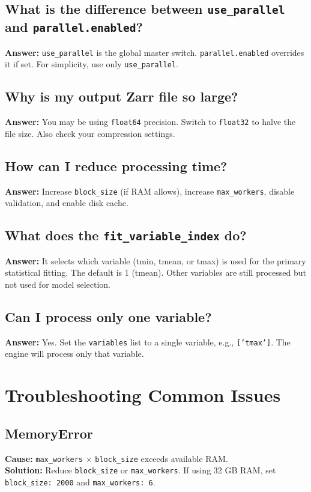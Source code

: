\documentclass[12pt,a4paper]{article}
\begin{document}
\subsection{What is the difference between \texttt{use\_parallel} and \texttt{parallel.enabled}?}
\textbf{Answer:} \texttt{use\_parallel} is the global master switch. \texttt{parallel.enabled} overrides it if set. For simplicity, use only \texttt{use\_parallel}.

\subsection{Why is my output Zarr file so large?}
\textbf{Answer:} You may be using \texttt{float64} precision. Switch to \texttt{float32} to halve the file size. Also check your compression settings.

\subsection{How can I reduce processing time?}
\textbf{Answer:} Increase \texttt{block\_size} (if RAM allows), increase \texttt{max\_workers}, disable validation, and enable disk cache.

\subsection{What does the \texttt{fit\_variable\_index} do?}
\textbf{Answer:} It selects which variable (tmin, tmean, or tmax) is used for the primary statistical fitting. The default is 1 (tmean). Other variables are still processed but not used for model selection.

\subsection{Can I process only one variable?}
\textbf{Answer:} Yes. Set the \texttt{variables} list to a single variable, e.g., \texttt{['tmax']}. The engine will process only that variable.

\section{Troubleshooting Common Issues}

\subsection{MemoryError}
\textbf{Cause:} \texttt{max\_workers} \(\times\) \texttt{block\_size} exceeds available RAM. \\
\textbf{Solution:} Reduce \texttt{block\_size} or \texttt{max\_workers}. If using 32 GB RAM, set \texttt{block\_size: 2000} and \texttt{max\_workers: 6}.
\end{document}
